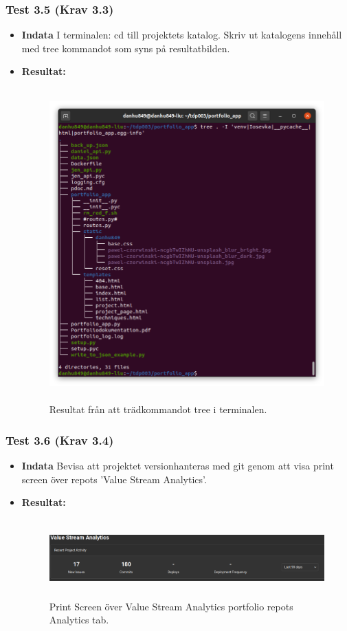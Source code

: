 \documentclass{TDP003mall}
\begin{document}
\subsubsection*{Test 3.5 (Krav 3.3)}
\begin{itemize}
\item[]\textbf{Indata} I terminalen: cd till projektets katalog. Skriv ut katalogens innehåll med tree kommandot som syns på resultatbilden. 
\item[]\textbf{Resultat:}
  \begin{figure}[h!]
\centerline{\includegraphics[width=\textwidth, height=12cm]{../Pictures/app_tree.png}}
\caption{Resultat från att trädkommandot tree i terminalen.\label{fig:}}
\end{figure}
\end{itemize}
\subsubsection*{Test 3.6 (Krav 3.4)}
\begin{itemize}
\item[]\textbf{Indata} Bevisa att projektet versionhanteras med git genom att visa print screen över repots 'Value Stream Analytics'.
\item[]\textbf{Resultat:}
\begin{figure}[h!]
\centerline{\includegraphics[width=\textwidth, height=3cm]{../Pictures/value_stream.png}}
\caption{Print Screen över Value Stream Analytics portfolio repots Analytics tab.\label{fig:}}
\end{figure}
\end{itemize}
\end{document}
